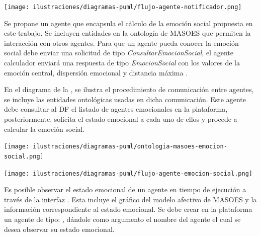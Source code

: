 \begin{ilustracion}[fuente=\yo, etiqueta=flujo-agente-notificador, titulo={Comunicación con el Agente Notificador}]
\texttt{[image: ilustraciones/diagramas-puml/flujo-agente-notificador.png]}
\end{ilustracion}


\label{agente-calculador-emocion-social}

Se propone un agente
que encapsula el cálculo de la emoción social
propuesta en este trabajo. Se incluyen entidades en la ontología de MASOES que permiten
la interacción con otros agentes.
Para que un agente pueda conocer la emoción social
debe enviar una solicitud de tipo \textit{ConsultarEmocionSocial},
el agente calculador enviará una respuesta de tipo \textit{EmocionSocial}
con los valores de la emoción central, dispersión emocional
y distancia máxima .

En el diagrama de la , se ilustra el procedimiento
de comunicación entre agentes, se incluye las entidades ontológicas usadas en dicha comunicación.
Este agente debe consultar al DF el listado de agentes emocionales en la plataforma,
posteriormente, solicita el estado emocional a cada uno de ellos y procede a calcular la emoción
social.

\begin{ilustracion}[fuente=\yo, etiqueta=ontologia-masoes-emocion-social, titulo={Ontología para MASOES, Acción Consultar Emoción Social}]
\texttt{[image: ilustraciones/diagramas-puml/ontologia-masoes-emocion-social.png]}
\end{ilustracion}

\begin{ilustracion}[fuente=\yo, etiqueta=flujo-agente-emocion-social, titulo={Comunicación con el Agente Calculador de Emoción Social}]
\texttt{[image: ilustraciones/diagramas-puml/flujo-agente-emocion-social.png]}
\end{ilustracion}


Es posible observar el estado emocional de un agente en tiempo de ejecución a través de la interfaz
 .
Esta incluye el gráfico del modelo afectivo de MASOES y la información correspondiente al estado emocional.
Se debe crear en la plataforma un agente de tipo: ,
dándole como argumento el
nombre del agente el cual se desea observar su estado emocional.

